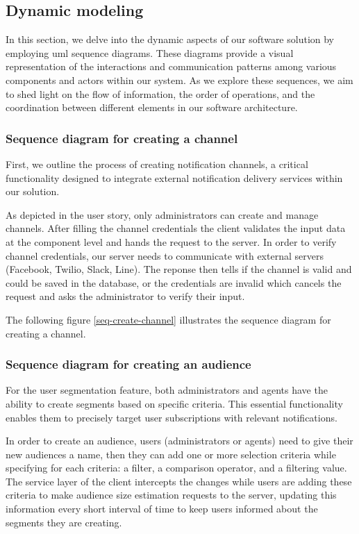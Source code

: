 \subsection{Dynamic modeling}
In this section, we delve into the dynamic aspects of our software solution by employing \acrshort{uml}
sequence diagrams. These diagrams provide a visual representation of the interactions and communication
patterns among various components and actors within our system. As we explore these sequences,
we aim to shed light on the flow of information, the order of operations, and the coordination
between different elements in our software architecture.

\subsubsection{Sequence diagram for creating a channel}
First, we outline the process of creating notification channels, a critical functionality
designed to integrate external notification delivery services within our solution.

As depicted in the user story, only administrators can create and manage channels. After filling the channel
credentials the client validates the input data at the component level and hands the request to
the server. In order to verify channel credentials, our server needs to communicate with external servers (Facebook,
Twilio, Slack, Line). The reponse then tells if the channel is valid and could be saved in the database,
or the credentials are invalid which cancels the request and asks the administrator to verify their input.

\noindent The following figure \ref{seq-create-channel} illustrates the sequence diagram for creating a channel.

\subsubsection{Sequence diagram for creating an audience}
For the user segmentation feature, both administrators and agents have the ability to create segments
based on specific criteria.  This essential functionality enables them to precisely target user subscriptions
with relevant notifications.

In order to create an audience, users (administrators or agents) need to give their new audiences a name,
then they can add one or more selection criteria while specifying for each criteria: a filter, a comparison operator,
and a filtering value. The service layer of the client intercepts the changes while users are adding these criteria
to make audience size estimation requests to the server, updating this information every short interval of time
to keep users informed about the segments they are creating.

